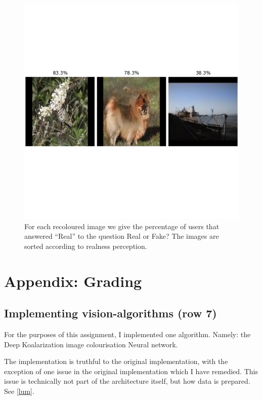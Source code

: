 \documentclass{article}
\begin{document}
       \begin{figure}[H]
           \centering
           \includegraphics[width=\textwidth]{img/originals_colourised.png}
           \caption{For each recoloured image we give the percentage of users that answered “Real” to the question Real or Fake? The images are sorted according to realness perception.}
           \label{fig:originals_perc}
       \end{figure}

  

\printbibliography{}

\appendix
\section{Appendix: Grading}
    \subsection{Implementing vision-algorithms (row 7)}
        For the purposes of this assignment, I implemented one algorithm. Namely: the Deep Koalarization image colourisation Neural network.
        
        The implementation is truthful to the original implementation, with the exception of one issue in the original implementation which I have remedied. This issue is technically not part of the architecture itself, but how data is prepared. See \ref{lum}.
        
\end{document}
